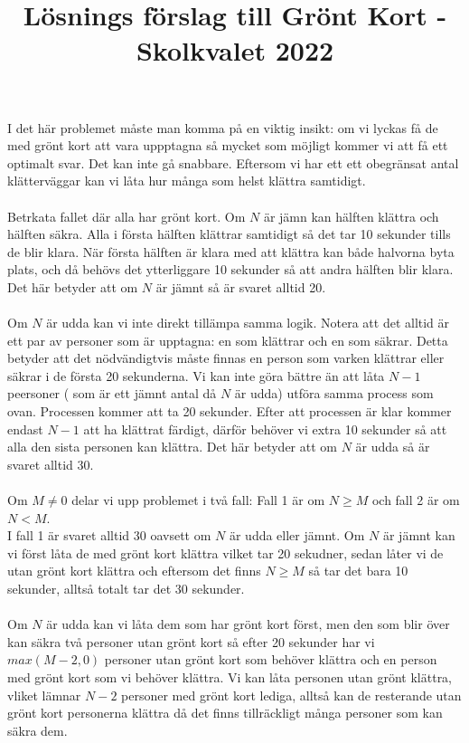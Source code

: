 \documentclass{article}
\title{Lösnings förslag till Grönt Kort - Skolkvalet 2022}
\begin{document}
\maketitle
I det här problemet måste man komma på en viktig insikt: om vi lyckas få de med grönt kort att vara uppptagna så mycket som möjligt kommer vi att få ett optimalt svar. Det kan inte gå snabbare. Eftersom vi har ett ett obegränsat antal klätterväggar kan vi låta hur många som helst klättra samtidigt.\\\\
Betrkata fallet där alla har grönt kort. Om $N$ är jämn kan hälften klättra och hälften säkra. Alla i första hälften klättrar samtidigt så det tar 10 sekunder tills de blir klara. När första hälften är klara med att klättra kan både halvorna byta plats, och då behövs det ytterliggare 10 sekunder så att andra hälften blir klara. Det här betyder att om $N$ är jämnt så är svaret alltid 20.\\\\
Om $N$ är udda kan vi inte direkt tillämpa samma logik. Notera att det alltid är ett par av personer som är upptagna: en som klättrar och en som säkrar. Detta betyder att det nödvändigtvis måste finnas en person som varken klättrar eller säkrar i de första 20 sekunderna. Vi kan inte göra bättre än att låta $N-1$ peersoner ( som är ett jämnt antal då $N$ är udda) utföra samma process som ovan. Processen kommer att ta 20 sekunder. Efter att processen är klar kommer endast $N-1$ att ha klättrat färdigt, därför behöver vi extra 10 sekunder så att alla den sista personen kan klättra. Det här betyder att om $N$ är udda så är svaret alltid 30.\\\\
Om $M \neq 0$ delar vi upp problemet i två fall: Fall 1 är om $N \geq M$ och fall 2 är om $N < M$.\\
I fall 1 är svaret alltid 30 oavsett om $N$ är udda eller jämnt. Om $N$ är jämnt kan vi först låta de med grönt kort klättra vilket tar 20 sekudner, sedan låter vi de utan grönt kort klättra och eftersom det finns $N \geq M$ så tar det bara 10 sekunder, alltså totalt tar det 30 sekunder.\\\\
Om $N$ är udda kan vi låta dem som har grönt kort först, men den som blir över kan säkra två personer utan grönt kort så efter 20 sekunder har vi $max(M -2,0)$ personer utan grönt kort som behöver klättra och en person med grönt kort som vi behöver klättra. Vi kan låta personen utan grönt klättra, vliket lämnar $N-2$ personer med grönt kort lediga, alltså kan de resterande utan grönt kort personerna klättra då det finns tillräckligt många personer som kan säkra dem.\\\\
\end{document}
